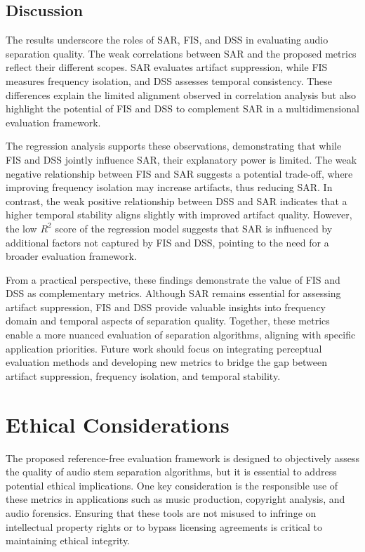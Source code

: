 \documentclass[10pt,twocolumn]{article}
\begin{document}
\subsection{Discussion}

The results underscore the roles of SAR, FIS, and DSS in evaluating audio separation quality. The weak correlations between SAR and the proposed metrics reflect their different scopes. SAR evaluates artifact suppression, while FIS measures frequency isolation, and DSS assesses temporal consistency. These differences explain the limited alignment observed in correlation analysis but also highlight the potential of FIS and DSS to complement SAR in a multidimensional evaluation framework.

The regression analysis supports these observations, demonstrating that while FIS and DSS jointly influence SAR, their explanatory power is limited. The weak negative relationship between FIS and SAR suggests a potential trade-off, where improving frequency isolation may increase artifacts, thus reducing SAR. In contrast, the weak positive relationship between DSS and SAR indicates that a higher temporal stability aligns slightly with improved artifact quality. However, the low $R^2$ score of the regression model suggests that SAR is influenced by additional factors not captured by FIS and DSS, pointing to the need for a broader evaluation framework.

From a practical perspective, these findings demonstrate the value of FIS and DSS as complementary metrics. Although SAR remains essential for assessing artifact suppression, FIS and DSS provide valuable insights into frequency domain and temporal aspects of separation quality. Together, these metrics enable a more nuanced evaluation of separation algorithms, aligning with specific application priorities. Future work should focus on integrating perceptual evaluation methods and developing new metrics to bridge the gap between artifact suppression, frequency isolation, and temporal stability.

\section{Ethical Considerations}

The proposed reference-free evaluation framework is designed to objectively assess the quality of audio stem separation algorithms, but it is essential to address potential ethical implications. One key consideration is the responsible use of these metrics in applications such as music production, copyright analysis, and audio forensics. Ensuring that these tools are not misused to infringe on intellectual property rights or to bypass licensing agreements is critical to maintaining ethical integrity.
\end{document}
